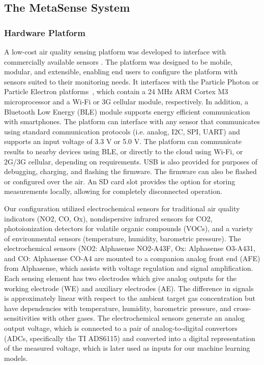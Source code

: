 \documentclass[journal abbreviation, manuscript]{copernicus}
\begin{document}
\subsection{The MetaSense System} 

\subsubsection{Hardware Platform}
A low-cost air quality sensing platform was developed to interface with commercially available sensors \citep{Chan2017context}. The platform was designed to be mobile, modular, and extensible, enabling end users to configure the platform with sensors suited to their monitoring needs. It interfaces with the Particle Photon or Particle Electron platforms~\cite{cite}, which contain a 24 MHz ARM Cortex M3 microprocessor and a Wi-Fi or 3G cellular module, respectively. In addition, a Bluetooth Low Energy (BLE) module supports energy efficient communication with smartphones. The platform can interface with any sensor that communicates using standard communication protocols (i.e. analog, I2C, SPI, UART) and supports an input voltage of 3.3 V or 5.0 V. The platform can communicate results to nearby devices using BLE, or directly to the cloud using Wi-Fi, or 2G/3G cellular, depending on requirements.  USB is also provided for purposes of debugging, charging, and flashing the firmware.  The firmware can also be flashed or configured over the air.  An SD card slot provides the option for storing measurements locally, allowing for completely disconnected operation.

Our configuration utilized electrochemical sensors for traditional air quality indicators (NO2, CO, Ox), nondispersive infrared sensors for CO2, photoionization detectors for volatile organic compounds (VOCs), and a variety of environmental sensors (temperature, humidity, barometric pressure). The electrochemical sensors (NO2: Alphasense NO2-A43F, Ox: Alphasense O3-A431, and CO: Alphasense CO-A4 are mounted to a companion analog front end (AFE) from Alphasense, which assists with voltage regulation and signal amplification. Each sensing element has two electrodes which give analog outputs for the working electrode (WE) and auxiliary electrodes (AE). The difference in signals is approximately linear with respect to the ambient target gas concentration but have dependencies with temperature, humidity, barometric pressure, and cross-sensitivities with other gases. The electrochemical sensors generate an analog output voltage, which is connected to a pair of analog-to-digital convertors (ADCs, specifically the TI ADS6115) and converted into a digital representation of the measured voltage, which is later used as inputs for our machine learning models.
\end{document}
